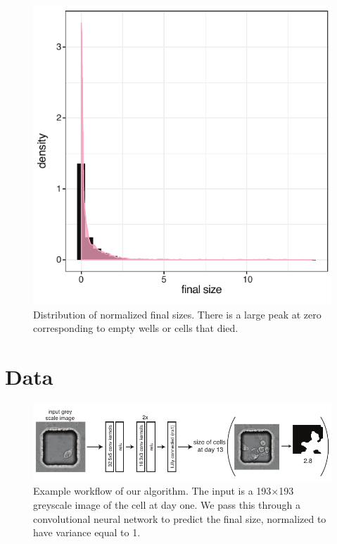 \documentclass[10pt,twocolumn,letterpaper]{article}
\begin{document}
\begin{figure}[b!]
\begin{center}
 \includegraphics[width=0.8\linewidth]{figures/final_day_hyst2_area_density.pdf}
\end{center}
   \caption{Distribution of normalized final sizes.  There is a large peak at zero corresponding to empty wells or cells that died.}
\label{final_size_dist}
\end{figure}

\section{Data}

\begin{figure}[t!]
\begin{center}
 \includegraphics[width=0.8\linewidth]{figures/networkExampleImage.pdf}
\end{center}
   \caption{Example workflow of our algorithm.  The input is a 193$\times$193 greyscale image of the cell at day one.  We pass this through a convolutional neural network to predict the final size, normalized to have variance equal to 1.}
\label{workflow}
\end{figure}
\end{document}
